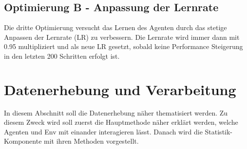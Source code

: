 \subsection{Optimierung B - Anpassung der Lernrate} \label{sec:Konzept_Optimierung02}
Die dritte Optimierung versucht das Lernen des Agenten durch das stetige Anpassen der Lernrate (LR) zu verbessern. 
Die Lernrate wird immer dann mit 0.95 multipliziert und als neue LR gesetzt, sobald keine Performance Steigerung in den letzten 200 Schritten erfolgt ist.

\section{Datenerhebung und Verarbeitung} \label{sec:Konzept_Datenerhebung_Verarbeitung}
In diesem Abschnitt soll die Datenerhebung näher thematisiert werden. Zu diesem Zweck wird soll zuerst die Hauptmethode näher erklärt werden, welche Agenten und Env mit einander interagieren lässt. Danach wird die Statistik-Komponente mit ihren Methoden vorgestellt.

